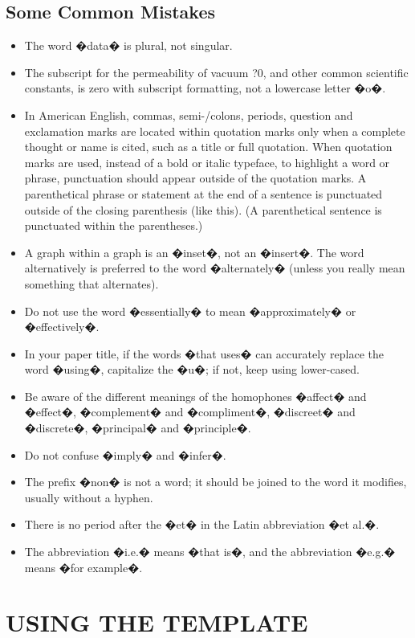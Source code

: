 \documentclass[a4paper, 10pt, conference]{ieeeconf}      %
\begin{document}
\subsection{Some Common Mistakes}
\begin{itemize}


\item The word �data� is plural, not singular.
\item The subscript for the permeability of vacuum ?0, and other common scientific constants, is zero with subscript formatting, not a lowercase letter �o�.
\item In American English, commas, semi-/colons, periods, question and exclamation marks are located within quotation marks only when a complete thought or name is cited, such as a title or full quotation. When quotation marks are used, instead of a bold or italic typeface, to highlight a word or phrase, punctuation should appear outside of the quotation marks. A parenthetical phrase or statement at the end of a sentence is punctuated outside of the closing parenthesis (like this). (A parenthetical sentence is punctuated within the parentheses.)
\item A graph within a graph is an �inset�, not an �insert�. The word alternatively is preferred to the word �alternately� (unless you really mean something that alternates).
\item Do not use the word �essentially� to mean �approximately� or �effectively�.
\item In your paper title, if the words �that uses� can accurately replace the word �using�, capitalize the �u�; if not, keep using lower-cased.
\item Be aware of the different meanings of the homophones �affect� and �effect�, �complement� and �compliment�, �discreet� and �discrete�, �principal� and �principle�.
\item Do not confuse �imply� and �infer�.
\item The prefix �non� is not a word; it should be joined to the word it modifies, usually without a hyphen.
\item There is no period after the �et� in the Latin abbreviation �et al.�.
\item The abbreviation �i.e.� means �that is�, and the abbreviation �e.g.� means �for example�.

\end{itemize}


\section{USING THE TEMPLATE}
\end{document}

